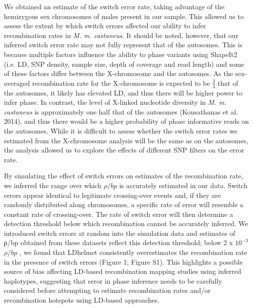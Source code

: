         	We obtained an estimate of the switch error rate, taking advantage of the hemizygous sex chromosomes of males present in our sample. This allowed us to assess the extent by which switch errors affected our ability to infer recombination rates in \emph{M. m. castaneus}. It should be noted, however, that our inferred switch error rate may not fully represent that of the autosomes. This is because multiple factors influence the ability to phase variants using ShapeIt2 (i.e. LD, SNP density, sample size, depth of coverage and read length) and some of these factors differ between the X-chromosome and the autosomes. As the sex-averaged recombination rate for the X-chromosome is expected to be \( \frac{3}{4} \) that of the autosomes, it likely has elevated LD, and thus there will be higher power to infer phase. In contrast, the level of X-linked nucleotide diversity in \emph{M. m. castaneus} is approximately one half that of the autosomes (Kousathanas et al. 2014), and thus there would be a higher probability of phase informative reads on the autosomes. While it is difficult to assess whether the switch error rates we estimated from the X-chromosome analysis will be the same as on the autosomes, the analysis allowed us to explore the effects of different SNP filters on the error rate.

By simulating the effect of switch errors on estimates of the recombination rate, we inferred the range over which $\rho / bp$ is accurately estimated in our data. Switch errors appear identical to legitimate crossing-over events and, if they are randomly distributed along chromosomes, a specific rate of error will resemble a constant rate of crossing-over. The rate of switch error will then determine a detection threshold below which recombination cannot be accurately inferred. We introduced switch errors at random into the simulation data and estimates of ρ/bp obtained from these datasets reflect this detection threshold; below 2 x $10^{-3}$ $\rho / bp$ , we found that LDhelmet consistently overestimates the recombination rate in the presence of switch errors (Figure 1; Figure S1). This highlights a possible source of bias affecting LD-based recombination mapping studies using inferred haplotypes, suggesting that error in phase inference needs to be carefully considered before attempting to estimate recombination rates and/or recombination hotspots using LD-based approaches.
 
